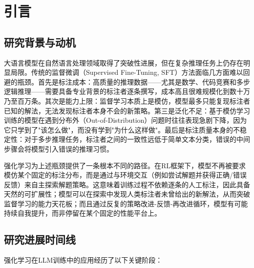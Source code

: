 \documentclass[12pt,a4paper]{article}
\begin{document}
\section{引言}

\subsection{研究背景与动机}

大语言模型在自然语言处理领域取得了突破性进展，但在复杂推理任务上仍存在明显局限。传统的监督微调（Supervised Fine-Tuning, SFT）方法面临几方面难以回避的瓶颈。首先是标注成本：高质量的推理数据——尤其是数学、代码竞赛和多步逻辑推理——需要具备专业背景的标注者逐条撰写，成本高且很难规模化到数十万乃至百万条。其次是能力上限：监督学习本质上是模仿，模型最多只能复现标注者已知的解法，无法发现标注者本身不会的新策略。第三是泛化不足：基于模仿学习训练的模型在遇到分布外（Out-of-Distribution）问题时往往表现急剧下降，因为它只学到了"该怎么做"，而没有学到"为什么这样做"。最后是标注质量本身的不稳定性：对于多步推理任务，标注者之间的一致性远低于简单文本分类，错误的中间步骤会将模型引入错误的推理习惯。

强化学习为上述瓶颈提供了一条根本不同的路径。在RL框架下，模型不再被要求模仿某个固定的标注分布，而是通过与环境交互（例如尝试解题并获得正确/错误反馈）来自主探索解题策略。这意味着训练过程不依赖逐条的人工标注，因此具备天然的可扩展性；模型可以在探索中发现人类标注者未曾给出的新解法，从而突破监督学习的能力天花板；而且通过反复的策略改进-反馈-再改进循环，模型有可能持续自我提升，而非停留在某个固定的性能平台上。

\subsection{研究进展时间线}

强化学习在LLM训练中的应用经历了以下关键阶段：
\end{document}
